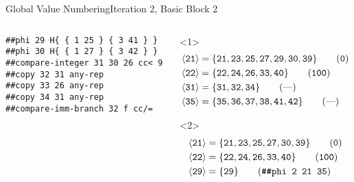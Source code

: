 \documentclass{beamer}
\newcommand{\vn}[1]{\ensuremath{\langle\texttt{#1}\rangle}}
\newcommand{\vreg}[1]{\texttt{#1}}
\begin{document}
\begin{frame}[fragile]{Global Value Numbering}{Iteration 2, Basic Block 2}
  \footnotesize
  \begin{columns}[t,onlytextwidth]
    \begin{column}[t]{.5\textwidth}
      \begin{Verbatim}[frame=single]
##phi 29 H{ { 1 25 } { 3 41 } }
##phi 30 H{ { 1 27 } { 3 42 } }
##compare-integer 31 30 26 cc< 9
##copy 32 31 any-rep
##copy 33 26 any-rep
##copy 34 31 any-rep
##compare-imm-branch 32 f cc/=
      \end{Verbatim}
    \end{column}
    \begin{column}{.5\textwidth}
      \begin{onlyenv}<1>
        \begin{align*}
          \vn{21} &= \{\vreg{21},
                       \vreg{23},
                       \vreg{25},
                       \vreg{27},
                       \vreg{29},
                       \vreg{30},
                       \vreg{39}\} \tag{\texttt{0}} \\
          \vn{22} &= \{\vreg{22},
                       \vreg{24},
                       \vreg{26},
                       \vreg{33},
                       \vreg{40}\} \tag{\texttt{100}} \\
          \vn{31} &= \{\vreg{31},
                       \vreg{32},
                       \vreg{34}\} \tag{---} \\
          \vn{35} &= \{\vreg{35},
                       \vreg{36},
                       \vreg{37},
                       \vreg{38},
                       \vreg{41},
                       \vreg{42}\} \tag{---}
        \end{align*}
      \end{onlyenv}
      \begin{onlyenv}<2>
        \begin{align*}
          \vn{21} &= \{\vreg{21},
                       \vreg{23},
                       \vreg{25},
                       \vreg{27},
                       \vreg{30},
                       \vreg{39}\} \tag{\texttt{0}} \\
          \vn{22} &= \{\vreg{22},
                       \vreg{24},
                       \vreg{26},
                       \vreg{33},
                       \vreg{40}\} \tag{\texttt{100}} \\
          \vn{29} &= \{\vreg{29}\} \tag{\texttt{\#\#phi 2 21 35}} \\

\end{align*}
\end{onlyenv}
\end{column}
\end{columns}
\end{frame}
\end{document}
